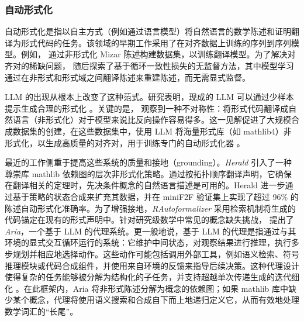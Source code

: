 \documentclass[11pt]{article}
\numberwithin{equation}{section}
\begin{document}
\subsubsection{自动形式化}

自动形式化是指以自主方式（例如通过语言模型）将自然语言的数学陈述和证明翻译为形式代码的任务。该领域的早期工作采用了在对齐数据上训练的序列到序列模型。例如，\cite{wang2018first} 通过非形式化 Mizar 陈述构建数据集，以训练翻译模型。为了解决对齐对的稀缺问题，\cite{wang2020exploration} 随后探索了基于循环一致性损失的无监督方法，其中模型学习通过在非形式和形式域之间翻译陈述来重建陈述，而无需显式监督。

LLM 的出现从根本上改变了这种范式。研究表明，现成的 LLM 可以通过少样本提示生成合理的形式化 \cite{wu2022autoformalization,gadgil2022towards,agrawal2022towards,azerbayev2023proofnet}。关键的是，\cite{wu2022autoformalization} 观察到一种不对称性：将形式代码翻译成自然语言（非形式化）对于模型来说比反向操作容易得多。这一见解促进了大规模合成数据集的创建，在这些数据集中，使用 LLM 将海量形式库（如 mathlib4）非形式化，以生成高质量的对齐对，用于训练专门的自动形式化器 \cite{jiang2023multilingual,lu2024process,gao2025herald,liu2025rethinking}。

最近的工作侧重于提高这些系统的质量和接地（grounding）。\textit{Herald} \cite{gao2025herald} 引入了一种尊崇库 mathlib 依赖图的层次非形式化策略。通过按拓扑顺序翻译声明，它确保在翻译相关的定理时，先决条件概念的自然语言描述是可用的。Herald 进一步通过基于策略的状态合成来扩充其数据，并在 miniF2F 验证集上实现了超过 96\% 的陈述自动形式化准确率。为了增强接地，\textit{RAutoformalizer} \cite{liu2025rethinking} 采用检索机制将生成的代码锚定在现有的形式声明中。针对研究级数学中常见的概念缺失挑战，\cite{wang2025aria} 提出了 \textit{Aria}，一个基于 LLM 的代理系统。更一般地说，基于 LLM 的代理是指通过与其环境的显式交互循环运行的系统：它维护中间状态，对观察结果进行推理，执行多步规划并相应地选择动作。这些动作可能包括调用外部工具，例如语义检索、符号推理模块或代码合成组件，并使用来自环境的反馈来指导后续决策。这种代理设计使得复杂的任务能够被分解为结构化的子任务，并支持超越单次传递生成的迭代细化 \cite{wang2024survey}。在此框架内，Aria 将非形式陈述分解为概念的依赖图；如果 mathlib 库中缺少某个概念，代理将使用语义搜索和合成自下而上地递归定义它，从而有效地处理数学词汇的“长尾”。
\end{document}
